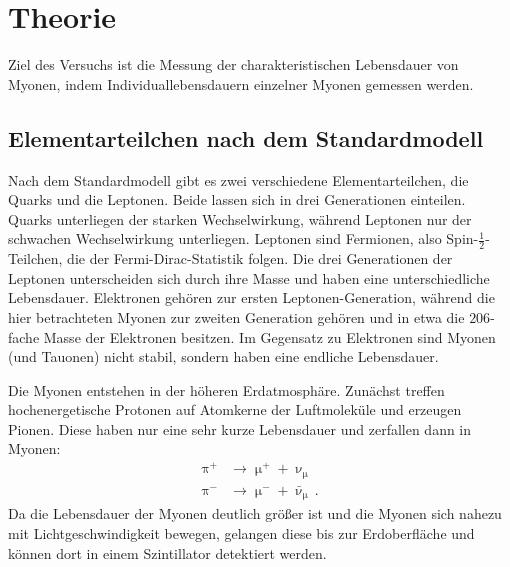 \section{Theorie}
Ziel des Versuchs ist die Messung der charakteristischen Lebensdauer von Myonen, indem Individuallebensdauern
einzelner Myonen gemessen werden.
\subsection{Elementarteilchen nach dem Standardmodell}
\label{sec:1}
Nach dem Standardmodell gibt es zwei verschiedene Elementarteilchen, die Quarks und die Leptonen. Beide lassen sich in
drei Generationen einteilen. Quarks unterliegen der starken Wechselwirkung, während Leptonen nur der schwachen Wechselwirkung
unterliegen. Leptonen sind Fermionen, also Spin-$\frac{1}{2}$-Teilchen, die der Fermi-Dirac-Statistik folgen.
Die drei Generationen der Leptonen unterscheiden sich durch ihre Masse und haben eine unterschiedliche Lebensdauer.
Elektronen gehören zur ersten Leptonen-Generation, während die hier betrachteten Myonen zur zweiten Generation gehören und in etwa
die $\num{206}$-fache Masse der Elektronen besitzen. Im Gegensatz zu Elektronen sind Myonen (und Tauonen) nicht stabil, sondern
haben eine endliche Lebensdauer.

Die Myonen entstehen in der höheren Erdatmosphäre. Zunächst treffen hochenergetische Protonen
auf Atomkerne der Luftmoleküle und erzeugen Pionen. Diese haben nur eine sehr kurze Lebensdauer und zerfallen dann in Myonen:
\begin{align*}
  \uppi^+ &\to \upmu^+ + \upnu_{\upmu} \\
  \uppi^- &\to \upmu^- + \bar{\upnu}_{\upmu}\,.
\end{align*}
Da die Lebensdauer der Myonen deutlich größer ist und die Myonen sich nahezu mit Lichtgeschwindigkeit bewegen, gelangen diese
bis zur Erdoberfläche und können dort in einem Szintillator detektiert werden.


